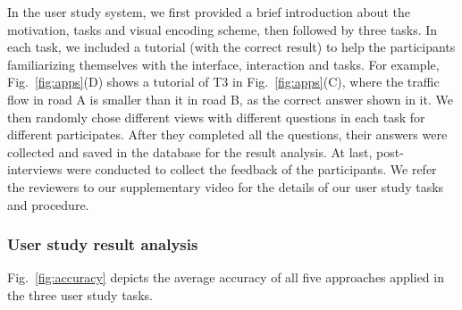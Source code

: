 In the user study system, we first provided a brief introduction about the motivation, tasks and visual encoding scheme, then followed by three tasks.
In each task, we included a tutorial (with the correct result) to help the participants familiarizing themselves with the interface, interaction and tasks.
For example, Fig.~\ref{fig:apps}(D) shows a tutorial of T3 in Fig.~\ref{fig:apps}(C), where the traffic flow in road A is smaller than it in road B, as the correct answer shown in it.
We then randomly chose different views with different questions in each task for different participates.
After they completed all the questions, their answers were collected and saved in the database for the result analysis.
At last, post-interviews were conducted to collect the feedback of the participants.
We refer the reviewers to our supplementary video for the details of our user study tasks and procedure.


\subsubsection{User study result analysis}\label{sec:uret}
Fig.~\ref{fig:accuracy} depicts the average accuracy of all five approaches applied in the three user study tasks.



